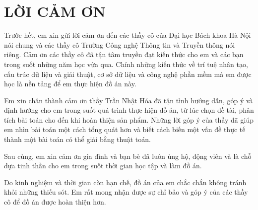 \chapter*{\centering LỜI CẢM ƠN}

Trước hết, em xin gửi lời cảm ơn đến các thầy cô của Đại học Bách khoa Hà Nội nói chung và các thầy cô Trường Công nghệ Thông tin và Truyền thông nói riêng. Cảm ơn các thầy cô đã tận tâm truyền đạt kiến thức cho em và các bạn trong suốt những năm học vừa qua. Chính những kiến thức về trí tuệ nhân tạo, cấu trúc dữ liệu và giải thuật, cơ sở dữ liệu và công nghệ phần mềm mà em được học là nền tảng để em thực hiện đồ án này.

Em xin chân thành cảm ơn thầy Trần Nhật Hóa đã tận tình hướng dẫn, góp ý và định hướng cho em trong suốt quá trình thực hiện đồ án, từ lúc chọn đề tài, phân tích bài toán cho đến khi hoàn thiện sản phẩm. Những lời góp ý của thầy đã giúp em nhìn bài toán một cách tổng quát hơn và biết cách biến một vấn đề thực tế thành một bài toán có thể giải bằng thuật toán.

Sau cùng, em xin cảm ơn gia đình và bạn bè đã luôn ủng hộ, động viên và là chỗ dựa tinh thần cho em trong suốt thời gian học tập và làm đồ án.

Do kinh nghiệm và thời gian còn hạn chế, đồ án của em chắc chắn không tránh khỏi những thiếu sót. Em rất mong nhận được sự chỉ bảo và góp ý của các thầy cô để đồ án được hoàn thiện hơn.

